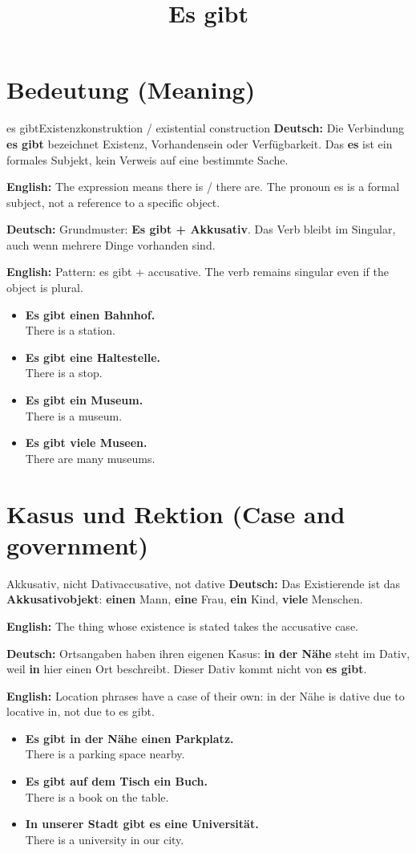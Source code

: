 \documentclass[a4paper,11pt]{article}
\title{Es gibt}
\date{}
\newcommand{\GermanText}[1]{\textbf{Deutsch: }#1\par}
\newcommand{\EnglishText}[1]{{\small\color{SoftGray}\textbf{English: }#1\par}}
\newcommand{\ExampleItem}[2]{\item \textbf{#1}\\{\small\color{SoftGray}#2}}
\begin{document}
\maketitle
\tableofcontents
\newpage
\section{Bedeutung (Meaning)}
\begin{grammarentry}{es gibt}{Existenzkonstruktion / existential construction}
\GermanText{Die Verbindung \textbf{es gibt} bezeichnet Existenz, Vorhandensein oder Verfügbarkeit. Das \textbf{es} ist ein formales Subjekt, kein Verweis auf eine bestimmte Sache.}
\EnglishText{The expression means there is / there are. The pronoun es is a formal subject, not a reference to a specific object.}
\GermanText{Grundmuster: \textbf{Es gibt + Akkusativ}. Das Verb bleibt im Singular, auch wenn mehrere Dinge vorhanden sind.}
\EnglishText{Pattern: es gibt + accusative. The verb remains singular even if the object is plural.}
\end{grammarentry}
\begin{exbox}\begin{itemize}
\ExampleItem{Es gibt einen Bahnhof.}{There is a station.}
\ExampleItem{Es gibt eine Haltestelle.}{There is a stop.}
\ExampleItem{Es gibt ein Museum.}{There is a museum.}
\ExampleItem{Es gibt viele Museen.}{There are many museums.}
\end{itemize}\end{exbox}
\section{Kasus und Rektion (Case and government)}
\begin{grammarentry}{Akkusativ, nicht Dativ}{accusative, not dative}
\GermanText{Das Existierende ist das \textbf{Akkusativobjekt}: \textbf{einen} Mann, \textbf{eine} Frau, \textbf{ein} Kind, \textbf{viele} Menschen.}
\EnglishText{The thing whose existence is stated takes the accusative case.}
\GermanText{Ortsangaben haben ihren eigenen Kasus: \textbf{in der Nähe} steht im Dativ, weil \textbf{in} hier einen Ort beschreibt. Dieser Dativ kommt nicht von \textbf{es gibt}.}
\EnglishText{Location phrases have a case of their own: in der Nähe is dative due to locative in, not due to es gibt.}
\end{grammarentry}
\begin{exbox}\begin{itemize}
\ExampleItem{Es gibt in der Nähe einen Parkplatz.}{There is a parking space nearby.}
\ExampleItem{Es gibt auf dem Tisch ein Buch.}{There is a book on the table.}
\ExampleItem{In unserer Stadt gibt es eine Universität.}{There is a university in our city.}
\end{itemize}\end{exbox}
\end{document}
